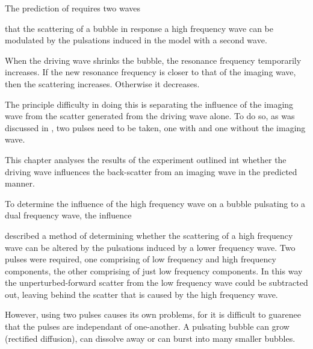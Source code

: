 The prediction of  requires two waves

that the scattering of a bubble in response a high frequency wave
can be modulated by the pulsations induced in the model with a second wave.

When the driving wave shrinks the bubble, the resonance frequency temporarily increases.
If the new resonance frequency is closer to that of the imaging wave, then the scattering increases.
Otherwise it decreases.


The principle difficulty in doing this is separating the influence of the imaging wave from 
the scatter generated from the driving wave alone.
To do so, as was discussed in ,
two pulses need to be taken, one with and one without the imaging wave.


This chapter analyses the results of the experiment outlined int  whether the driving  wave influences the back-scatter from an imaging wave in the predicted manner.


To determine the influence of the high frequency wave 
on a bubble pulsating to a dual frequency wave,
the influence 

 described a method of determining whether the scattering of a high frequency wave
can be altered by the pulsations induced by  a lower frequency wave.
Two pulses were required, 
one comprising of low frequency and high frequency components,
the other comprising of just low frequency components.
In this way the unperturbed-forward scatter from the low frequency wave could be subtracted out, 
leaving behind the scatter that is caused by the high frequency wave.

However, using two pulses causes its own problems,
for it is difficult to guarenee that the pulses are independant of one-another.
A pulsating bubble can grow (rectified diffusion),
can dissolve away or can burst into many smaller bubbles. 







